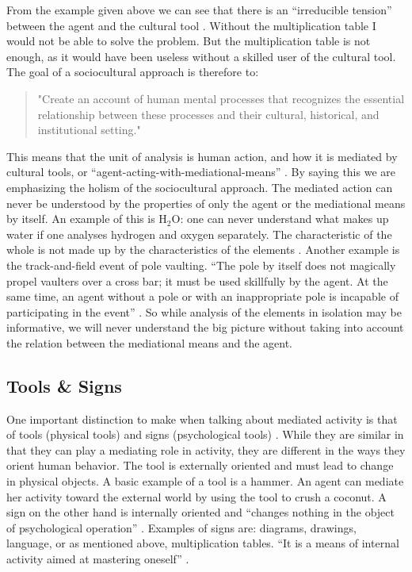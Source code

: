 From the example given above we can see that there is an “irreducible tension” between the agent and the cultural tool \citep{wertsch1998mind}. Without the multiplication table I would not be able to solve the problem. But the multiplication table is not enough, as it would have been useless without a skilled user of the cultural tool. The goal of a sociocultural approach is therefore to: 

\begin{quote}
"Create an account of human mental processes that recognizes the essential relationship between these processes and their cultural, historical, and institutional setting."\citep{wertsch1998mind} 
\end{quote}

This means that the unit of analysis is human action, and how it is mediated by cultural tools, or “agent-acting-with-mediational-means” \citep[\citealp{wertsch1993sociocultural} cited in][]{wertsch1998mind}. By saying this we are emphasizing the holism of the sociocultural approach. The mediated action can never be understood by the properties of only the agent or the mediational means by itself. An example of this is $\text{H}_2\text{O}$: one can never understand what makes up water if one analyses hydrogen and oxygen separately. The characteristic of the whole is not made up by the characteristics of the elements \citep{vygotskiui1978mind}. Another example is the track-and-field event of pole vaulting. “The pole by itself does not magically propel vaulters over a cross bar; it must be used skillfully by the agent. At the same time, an agent without a pole or with an inappropriate pole is incapable of participating in the event” \citep{wertsch1998mind}. So while analysis of the elements in isolation may be informative, we will never understand the big picture without taking into account the relation between the mediational means and the agent.  

\subsection{Tools \& Signs}
One important distinction to make when talking about mediated activity is that of tools (physical tools) and signs (psychological tools) \citep{vygotskiui1978mind}. While they are similar in that they can play a mediating role in activity, they are different in the ways they orient human behavior. The tool is externally oriented and must lead to change in physical objects. A basic example of a tool is a hammer. An agent can mediate her activity toward the external world by using the tool to crush a coconut. A sign on the other hand is internally oriented and “changes nothing in the object of psychological operation” \citep{vygotskiui1978mind}. Examples of signs are: diagrams, drawings, language, or as mentioned above, multiplication tables. “It is a means of internal activity aimed at mastering oneself” \citep{vygotskiui1978mind}. 

